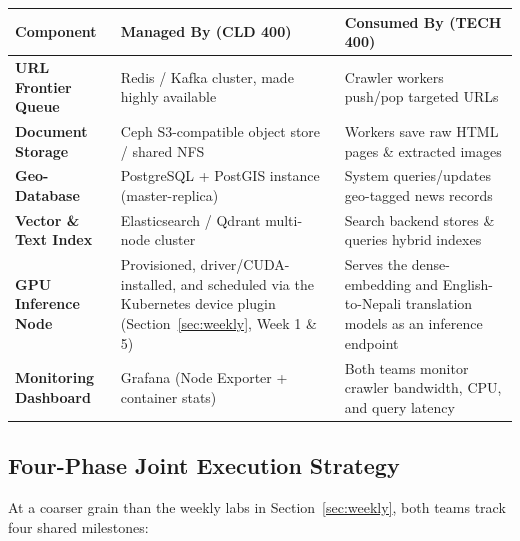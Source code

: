 \documentclass[10pt, a4paper]{article}
\begin{document}
\begin{table}[H]
\centering
\small
\renewcommand{\arraystretch}{1.25}
\begin{tabularx}{\textwidth}{|>{\bfseries}l|X|X|}
\hline
\rowcolor{lightgray}
Component & Managed By (CLD 400) & Consumed By (TECH 400) \\ \hline
URL Frontier Queue & Redis / Kafka cluster, made highly available & Crawler workers push/pop targeted URLs \\ \hline
Document Storage & Ceph S3-compatible object store / shared NFS & Workers save raw HTML pages \& extracted images \\ \hline
Geo-Database & PostgreSQL + PostGIS instance (master-replica) & System queries/updates geo-tagged news records \\ \hline
Vector \& Text Index & Elasticsearch / Qdrant multi-node cluster & Search backend stores \& queries hybrid indexes \\ \hline
GPU Inference Node & Provisioned, driver/CUDA-installed, and scheduled via the Kubernetes device plugin (Section~\ref{sec:weekly}, Week 1 \& 5) & Serves the dense-embedding and English-to-Nepali translation models as an inference endpoint \\ \hline
Monitoring Dashboard & Grafana (Node Exporter + container stats) & Both teams monitor crawler bandwidth, CPU, and query latency \\ \hline
\end{tabularx}
\end{table}

\subsection*{Four-Phase Joint Execution Strategy}
At a coarser grain than the weekly labs in Section~\ref{sec:weekly}, both teams track four shared milestones:
\end{document}
